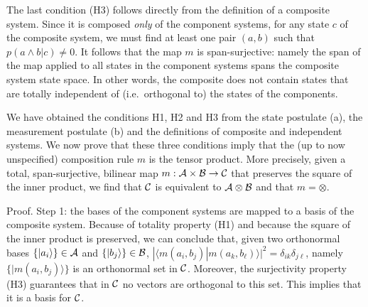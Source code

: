 \documentclass[aps,prl,amsmath,amssymb,twocolumn]{revtex4}
\theoremstyle{plain}
\theoremstyle{definition}
\theoremstyle{remark}
\def\>{\rangle}
\def\<{\langle}
\begin{document}
	The last condition (H3) follows directly from the definition of a
	composite system. Since it is composed {\em only} of the component
	systems, for any state $c$ of the composite system, we must find at least one pair $(a, b)$ such that $p(a\wedge b | c)\neq 0$. It follows that the map $m$ is span-surjective: namely the
	span of the map applied to all states in the component systems spans
	the composite system state space. In other words, the composite does
	not contain states that are totally independent of (i.e.~orthogonal
	to) the states of the components.
	
	We have obtained the conditions H1, H2 and H3 from the state postulate
	(a), the measurement postulate (b) and the definitions of composite
	and independent systems. We now prove that these three conditions
	imply that the (up to now unspecified) composition rule $m$ is the
	tensor product. More precisely, given a total, span-surjective,
	bilinear map $m:{\cal A}\times{\cal B}\to{\cal C}$ that preserves the
	square of the inner product, we find that $\cal C $ is equivalent to
	$\cal A \otimes \cal B $ and that $m=\otimes$.
	
	Proof. Step 1: the bases of the component systems are mapped to a basis of
	the composite system. Because of totality property (H1) and because
	the square of the inner product is preserved, we can conclude that,
	given two orthonormal bases $\{|a_i\>\}\in{\cal A}$ and
	$\{|b_j\>\}\in{\cal B}$,
	$|\<m(a_i,b_j)|m(a_k,b_\ell)\>|^2=\delta_{ik}\delta_{j\ell}$, namely
	$\{|m(a_i,b_j)\>\}$ is an orthonormal set in $\cal C$.  Moreover, the
	surjectivity property (H3) guarantees that in $\cal C$ no vectors are
	orthogonal to this set. This implies that it is a basis for $\cal C$.
	
\end{document}
